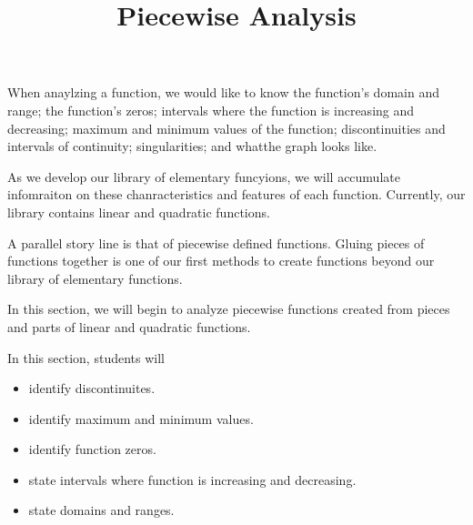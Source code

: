 \documentclass{ximera}
\title{Piecewise Analysis}
\begin{document}
\begin{abstract}
\end{abstract}
\maketitle




When anaylzing a function, we would like to know the function's domain and range; the function's zeros; intervals where the function is increasing and decreasing; maximum and minimum values of the function; discontinuities and intervals of continuity; singularities; and whatthe graph looks like.



As we develop our library of elementary funcyions, we will accumulate infomraiton on these chanracteristics and features of each function.  Currently, our library contains linear and quadratic functions.  

A parallel story line is that of piecewise defined functions.  Gluing pieces of functions together is one of our first methods to create functions beyond our library of elementary functions.

In this section, we will begin to analyze piecewise functions created from pieces and parts of linear and quadratic functions.



















\begin{sectionOutcomes}
In this section, students will 

\begin{itemize}
\item identify discontinuites.
\item identify maximum and minimum values.
\item identify function zeros.
\item state intervals where function is increasing and decreasing.
\item state domains and ranges.
\end{itemize}
\end{sectionOutcomes}
\end{document}
